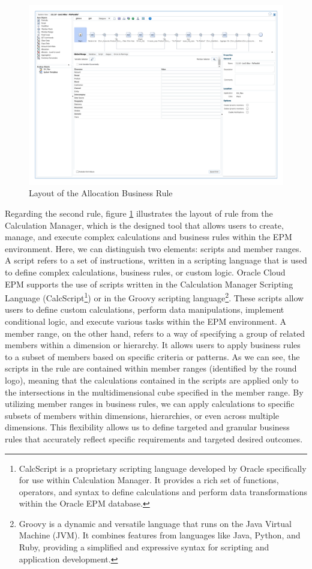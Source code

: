 \documentclass[12pt,a4paper,openright,twoside]{book}
\begin{document}
\begin{figure}[ht]
	\centering
	\includegraphics[width=\linewidth]{figures/rule-allocation.pdf}
	\caption{Layout of the Allocation Business Rule}
	\label{fig:rule-alloc}
\end{figure}

Regarding the second rule, figure \ref{fig:rule-alloc} illustrates the layout of rule from the Calculation Manager, which is the designed tool that allows users to create, manage, and execute complex calculations and business rules within the EPM environment. 
%
Here, we can distinguish two elements: scripts and member ranges.
%
A script refers to a set of instructions, written in a scripting language that is used to define complex calculations, business rules, or custom logic.
%
Oracle Cloud EPM supports the use of scripts written in the Calculation Manager Scripting Language (CalcScript\footnote{CalcScript is a proprietary scripting language developed by Oracle specifically for use within Calculation Manager. It provides a rich set of functions, operators, and syntax to define calculations and perform data transformations within the Oracle EPM database.}) or in the Groovy scripting language\footnote{Groovy is a dynamic and versatile language that runs on the Java Virtual Machine (JVM). It combines features from languages like Java, Python, and Ruby, providing a simplified and expressive syntax for scripting and application development.}. 
%
These scripts allow users to define custom calculations, perform data manipulations, implement conditional logic, and execute various tasks within the EPM environment.
%
A member range, on the other hand, refers to a way of specifying a group of related members within a dimension or hierarchy.
%
It allows users to apply business rules to a subset of members based on specific criteria or patterns.
%
As we can see, the scripts in the rule are contained within member ranges (identified by the round logo), meaning that the calculations contained in the scripts are applied only to the intersections in the multidimensional cube specified in the member range.
%
By utilizing member ranges in business rules, we can apply calculations to specific subsets of members within dimensions, hierarchies, or even across multiple dimensions. 
%
This flexibility allows us to define targeted and granular business rules that accurately reflect specific requirements and targeted desired outcomes.
\end{document}
